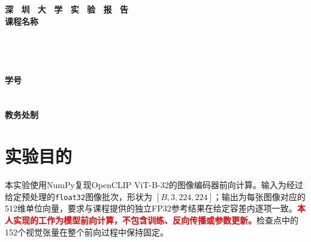 \documentclass[a4paper,12pt]{article}
\newcommand{\studenthighlight}[1]{\textcolor{red}{\textbf{#1}}}
\begin{document}
\begin{titlepage}
    \centering
    \vspace*{2cm}
    \Huge{\textbf{深 \ 圳 \ 大 \ 学 \ 实 \ 验  \ 报 \ 告}}\\[1.5cm]
    
    {\Large\textbf{课程名称}\quad\underline{}}\\[0.5cm]
{\Large
\noindent{}
\underline{}}\\[0.5cm]
{\Large
\noindent{}
\underline{}}\\[0.5cm]
{\Large
\noindent{}
\underline{}}\\[0.5cm]
{\Large
\noindent{}
\underline{}}\\[0.5cm]
{\Large
\noindent{}
\underline{}
\hspace{0.5cm}
\textbf{学号}
\underline{}}\\[0.5cm]
{\Large
\noindent{}
\underline{}}\\[0.5cm]
{\Large
\noindent{}
\underline{}}\\[1.5cm]

    \vfill
    \Large{\textbf{教务处制}}
\end{titlepage}

\newpage

\section{实验目的}

本实验使用NumPy复现OpenCLIP ViT-B-32的图像编码器前向计算。输入为经过给定预处理的\texttt{float32}图像批次，形状为 $[B,3,224,224]$；输出为每张图像对应的512维单位向量，要求与课程提供的独立FP32参考结果在给定容差内逐项一致。\studenthighlight{本人实现的工作为模型前向计算，不包含训练、反向传播或参数更新。}检查点中的152个视觉张量在整个前向过程中保持固定。
\end{document}
